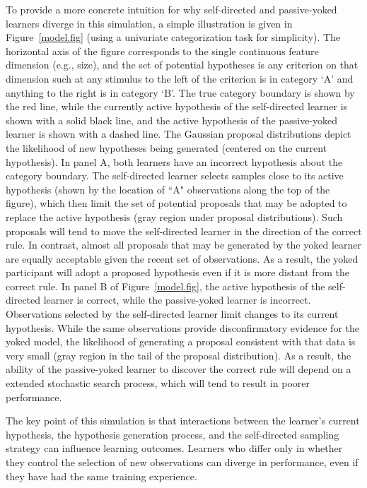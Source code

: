 \documentclass[3p,twocolumn,authoryear,10pt]{elsarticle}
\begin{document}
To provide a more concrete intuition for why self-directed and passive-yoked learners diverge in this simulation, a simple illustration is given in Figure~\ref{model.fig} (using a univariate categorization task for simplicity).  The horizontal axis of the figure corresponds to the single continuous feature dimension (e.g., size), and the set of potential hypotheses is any criterion on that dimension such at any stimulus to the left of the criterion is in category `A' and anything to the right is in category `B'. The true category boundary is shown by the red line, while the currently active hypothesis of the self-directed learner is shown with a solid black line, and the active hypothesis of the passive-yoked learner is shown with a dashed line. The Gaussian proposal distributions depict the likelihood of new hypotheses being generated (centered on the current hypothesis). In panel A, both learners have an incorrect hypothesis about the category boundary. The self-directed learner selects samples close to its active hypothesis (shown by the location of ``A" observations along the top of the figure), which then limit the set of potential proposals that may be adopted to replace the active hypothesis (gray region under proposal distributions). Such proposals will tend to move the self-directed learner in the direction of the correct rule. In contrast, almost all proposals that may be generated by the yoked learner are equally acceptable given the recent set of observations. As a result, the yoked participant will adopt a proposed hypothesis even if it is more distant from the correct rule. In panel B of Figure~\ref{model.fig}, the active hypothesis of the self-directed learner is correct, while the passive-yoked learner is incorrect. Observations selected by the self-directed learner limit changes to its current hypothesis. While the same observations provide disconfirmatory evidence for the yoked model, the likelihood of generating a proposal consistent with that data is very small (gray region in the tail of the proposal distribution). As a result, the ability of the passive-yoked learner to discover the correct rule will depend on a extended stochastic search process, which will tend to result in poorer performance.

The key point of this simulation is that interactions between the learner's current hypothesis, the hypothesis generation process, and the self-directed sampling strategy can influence learning outcomes. Learners who differ only in whether they control the selection of new observations can diverge in performance, even if they have had the same training experience.
\end{document}
